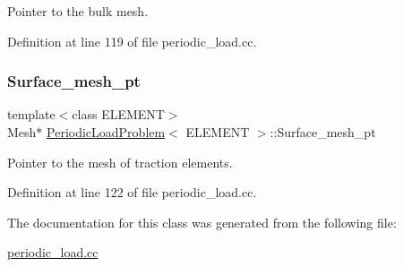 Pointer to the bulk mesh. 



Definition at line 119 of file periodic\+\_\+load.\+cc.

\mbox{\label{classPeriodicLoadProblem_a39b0b15487ae9aafc3d9e70b0e017325}} 
\subsubsection{\texorpdfstring{Surface\+\_\+mesh\+\_\+pt}{Surface\_mesh\_pt}}
{\footnotesize\ttfamily template$<$class E\+L\+E\+M\+E\+NT$>$ \\
Mesh$\ast$ \hyperlink{classPeriodicLoadProblem}{Periodic\+Load\+Problem}$<$ E\+L\+E\+M\+E\+NT $>$\+::Surface\+\_\+mesh\+\_\+pt\hspace{0.3cm}{\ttfamily [private]}}



Pointer to the mesh of traction elements. 



Definition at line 122 of file periodic\+\_\+load.\+cc.



The documentation for this class was generated from the following file\+:\begin{DoxyCompactItemize}
\item 
\hyperlink{periodic__load_8cc}{periodic\+\_\+load.\+cc}\end{DoxyCompactItemize}
